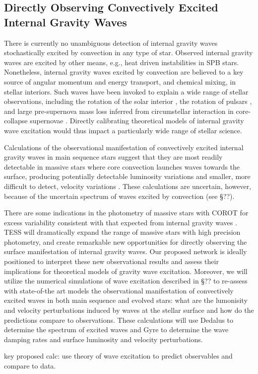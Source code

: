 \color{blue}
\subsection{Directly Observing Convectively Excited Internal Gravity Waves}

There is currently no unambiguous detection of  internal gravity waves stochastically excited by convection in any type of star.  Observed internal gravity waves  are excited by other means, e.g., heat driven instabilities in SPB stars. Nonetheless, internal gravity waves excited by convection are believed to a key source of angular momentum and energy transport, and chemical mixing, in stellar interiors.   Such waves have been invoked to explain a wide range of stellar observations, including the rotation of the solar interior \citep{kumar1999}, the rotation of pulsars \citep{fuller2015}, and large pre-supernova mass loss inferred from circumstellar interaction in core-collapse supernovae \citep{qs2012}.   Directly calibrating theoretical models of internal gravity wave excitation would thus impact a particularly wide range of stellar science.

Calculations of the observational manifestation of convectively excited internal gravity waves in main sequence stars suggest that they are most readily detectable in massive stars where core convection launches waves towards the surface, producing potentially detectable luminosity variations and smaller, more difficult to detect, velocity variations \citep{samadi2010, shiode2013}.   These calculations are uncertain, however, because of the uncertain spectrum of waves excited by convection (see \S ??).

There are some indications in the photometry of massive stars with COROT for excess variability consistent with that expected from internal gravity waves \citep{aerts2015}.   TESS will dramatically expand the range of massive stars with high precision photometry, and create remarkable new opportunities for directly observing the surface manifestation of internal gravity waves.   
Our proposed network is ideally positioned to interpret these new observational results and assess their implications for theoretical models of gravity wave excitation.   Moreover, we will utilize the numerical simulations of wave excitation described in \S ?? to re-assess with state-of-the art models the observational manifestation of convectively excited waves in both main sequence and evolved stars:   what are the lumonisity and velocity perturbations induced by waves at the stellar surface and how do the predictions compare to observations.  These calculations will use Dedalus to determine the spectrum of excited waves and Gyre to determine the wave damping rates and surface luminosity and velocity perturbations.   

key proposed calc:   use theory of wave excitation to predict observables and compare to data.

